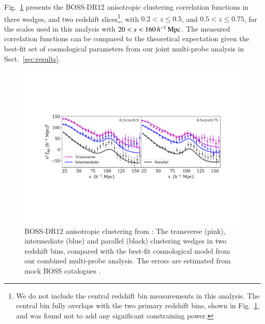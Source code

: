 Fig.~\ref{fig:wedges} presents the \citet{sanchez/etal:2017} BOSS-DR12 anisotropic clustering correlation functions in three wedges, and two redshift slices\footnote{We do not include the \citet{sanchez/etal:2017} central redshift bin measurements in this analysis.  The central bin fully overlaps with the two primary redshift bins, shown in Fig.~\ref{fig:wedges}, and was found not to add any significant constraining power.}, with $0.2<z\leq0.5$, and $0.5<z\leq0.75$, for the scales used in this analysis with $20  < s < 160\, h^{-1}\, {\rm Mpc}$.   The measured correlation functions can be compared to the theoretical expectation given the best-fit set of cosmological parameters from our joint multi-probe analysis in Sect.~\ref{sec:results}.

\begin{figure}
        \includegraphics[width=\textwidth]{Data_Plots/clustering_wedges/BOSS_Sanchez_wedges.pdf}
        \caption{BOSS-DR12 anisotropic clustering from \citet{sanchez/etal:2017}:
          The transverse (pink), intermediate (blue) and parallel
          (black) clustering wedges in two redshift bins, compared 
          with the best-fit
          cosmological model from our combined multi-probe analysis.  The errors are estimated from mock BOSS catalogues \citep{kitaura/etal:2016}.}
        \label{fig:wedges}
\end{figure}

